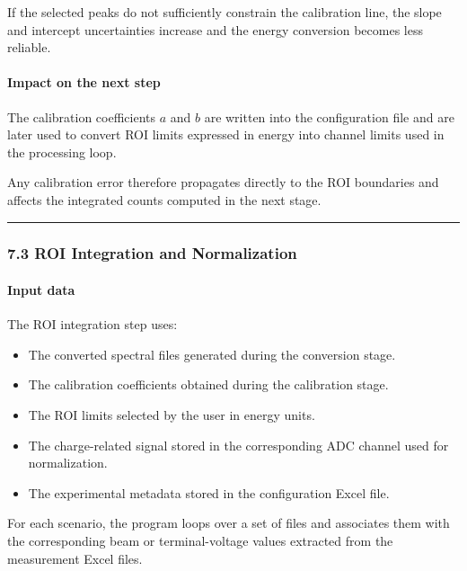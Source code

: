 If the selected peaks do not sufficiently constrain the calibration
line, the slope and intercept uncertainties increase and the energy
conversion becomes less reliable.

\hypertarget{impact-on-the-next-step-1}{%
\paragraph{Impact on the next step}\label{impact-on-the-next-step-1}}

The calibration coefficients \(a\) and \(b\) are written into the
configuration file and are later used to convert ROI limits expressed in
energy into channel limits used in the processing loop.

Any calibration error therefore propagates directly to the ROI
boundaries and affects the integrated counts computed in the next stage.

\begin{center}\rule{0.5\linewidth}{0.5pt}\end{center}

\hypertarget{roi-integration-and-normalization}{%
\subsubsection{7.3 ROI Integration and
Normalization}\label{roi-integration-and-normalization}}

\hypertarget{input-data-2}{%
\paragraph{Input data}\label{input-data-2}}

The ROI integration step uses:

\begin{itemize}
\tightlist
\item
  The converted spectral files generated during the conversion stage.
\item
  The calibration coefficients obtained during the calibration stage.
\item
  The ROI limits selected by the user in energy units.
\item
  The charge-related signal stored in the corresponding ADC channel used
  for normalization.
\item
  The experimental metadata stored in the configuration Excel file.
\end{itemize}

For each scenario, the program loops over a set of files and associates
them with the corresponding beam or terminal-voltage values extracted
from the measurement Excel files.

